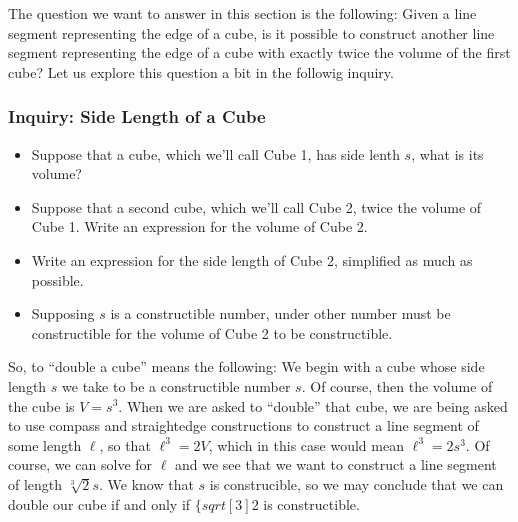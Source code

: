 \documentclass[11pt]{article}
\newenvironment{task}
	{\begin{mdframed}[linecolor=lightgray, linewidth=3pt]\raggedright}
	{\end{mdframed}}
\theoremstyle{definition}
\begin{document}
The question we want to answer in this section is the following: Given a line segment representing the edge of a cube, is it possible 
to construct another line segment representing the edge of a cube with exactly twice the volume of the first cube? Let us explore this
question a bit in the followig inquiry.

\subsubsection{Inquiry: Side Length of a Cube}
\begin{task}
  \begin{itemize}
    \item Suppose that a cube, which we'll call Cube 1, has side lenth $s$, what is its volume?
    \item Suppose that a second cube, which we'll call Cube 2, twice the volume of Cube 1. Write an expression for the volume of Cube 2.
    \item Write an expression for the side length of Cube 2, simplified as much as possible.
    \item Supposing $s$ is a constructible number, under other number must be constructible for the volume of Cube 2 to be constructible.
  \end{itemize}
  
\end{task}

So, to ``double a cube'' means the following: We begin with a cube whose side length $s$ we take to be a constructible number $s$. Of course, 
then the volume of the cube is $V=s^3$. When we are asked to ``double'' that cube, we are being asked to use compass and straightedge 
constructions to construct a line segment of some length $\ell$, so that $\ell^3 = 2V$, which in this case would mean $\ell^3 = 2s^3$. Of 
course, we can solve for $\ell$ and we see that we want to construct a line segment of length $\sqrt[3]{2}s$. We know that $s$ is construcible,
so we may conclude that we can double our cube if and only if $\{sqrt[3]{2}$ is constructible.
\end{document}
